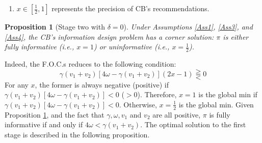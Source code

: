 \documentclass{beamer}
\newtheorem{proposition}{Proposition}
\begin{document}
\begin{frame}[allowframebreaks]
\begin{enumerate}
        \item $x\in\left[\frac{1}{2},1\right]$ represents the precision of CB's recommendations.
    \end{enumerate}
    \begin{proposition}[Stage two with $\delta=0$]
    \label{Prop1}
    Under Assumptions \ref{Ass1}, \ref{Ass3}, and \ref{Ass4}, the CB's information design problem has a corner solution: $\pi$ is either fully informative (i.e., $x=1$) or uninformative (i.e., $x=\frac{1}{2}$). 
\end{proposition} 
Indeed, the F.O.C.s reduces to the following condition:
\begin{equation}
    \gamma(v_1+v_2)[4\omega-\gamma(v_1+v_2)](2x-1)\gtreqqless 0
    \end{equation}
For any $x$, the former is always negative (positive) if $\gamma(v_1+v_2)[4\omega-\gamma(v_1+v_2)]<0$ ($>0$). 
\vskip10pt Therefore, $x=1$ is the global min if $\gamma(v_1+v_2)[4\omega-\gamma(v_1+v_2)]<0$. Otherwise, $x=\frac{1}{2}$ is the global min.
\vskip5pt 
\framebreak
Given Proposition \ref{Prop1}, and the fact that $\gamma,\omega,v_1$ and $v_2$ are all positive, $\pi$ is fully informative if and only if $4\omega<\gamma(v_1+v_2)$. The optimal solution to the first stage is described in the following proposition.


\end{frame}
\end{document}
